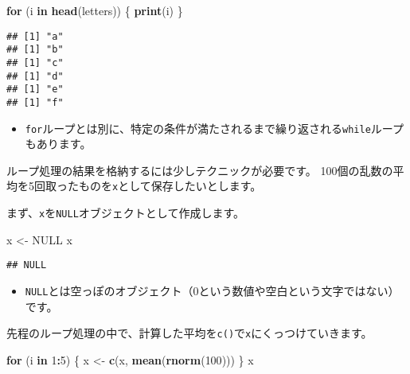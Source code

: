 \documentclass[]{bxjsarticle}
\newenvironment{Shaded}{\begin{snugshade}}{\end{snugshade}}
\newcommand{\ControlFlowTok}[1]{\textcolor[rgb]{0.13,0.29,0.53}{\textbf{#1}}}
\newcommand{\DecValTok}[1]{\textcolor[rgb]{0.00,0.00,0.81}{#1}}
\newcommand{\KeywordTok}[1]{\textcolor[rgb]{0.13,0.29,0.53}{\textbf{#1}}}
\newcommand{\NormalTok}[1]{#1}
\newcommand{\OperatorTok}[1]{\textcolor[rgb]{0.81,0.36,0.00}{\textbf{#1}}}
\newcommand{\OtherTok}[1]{\textcolor[rgb]{0.56,0.35,0.01}{#1}}
\newcommand{\StringTok}[1]{\textcolor[rgb]{0.31,0.60,0.02}{#1}}
\providecommand{\tightlist}{%
  \setlength{\itemsep}{0pt}\setlength{\parskip}{0pt}}
\begin{document}
\begin{Shaded}
\begin{Highlighting}[]
\ControlFlowTok{for}\NormalTok{ (i }\ControlFlowTok{in} \KeywordTok{head}\NormalTok{(letters)) \{}
  \KeywordTok{print}\NormalTok{(i)}
\NormalTok{\}}
\end{Highlighting}
\end{Shaded}

\begin{verbatim}
## [1] "a"
## [1] "b"
## [1] "c"
## [1] "d"
## [1] "e"
## [1] "f"
\end{verbatim}

\begin{itemize}
\tightlist
\item
  \texttt{for}ループとは別に、特定の条件が満たされるまで繰り返される\texttt{while}ループもあります。
\end{itemize}

ループ処理の結果を格納するには少しテクニックが必要です。
100個の乱数の平均を5回取ったものを\texttt{x}として保存したいとします。

まず、\texttt{x}を\texttt{NULL}オブジェクトとして作成します。

\begin{Shaded}
\begin{Highlighting}[]
\NormalTok{x <-}\StringTok{ }\OtherTok{NULL}
\NormalTok{x}
\end{Highlighting}
\end{Shaded}

\begin{verbatim}
## NULL
\end{verbatim}

\begin{itemize}
\tightlist
\item
  \texttt{NULL}とは空っぽのオブジェクト（0という数値や空白という文字ではない）です。
\end{itemize}

先程のループ処理の中で、計算した平均を\texttt{c()}で\texttt{x}にくっつけていきます。

\begin{Shaded}
\begin{Highlighting}[]
\ControlFlowTok{for}\NormalTok{ (i }\ControlFlowTok{in} \DecValTok{1}\OperatorTok{:}\DecValTok{5}\NormalTok{) \{}
\NormalTok{  x <-}\StringTok{ }\KeywordTok{c}\NormalTok{(x, }\KeywordTok{mean}\NormalTok{(}\KeywordTok{rnorm}\NormalTok{(}\DecValTok{100}\NormalTok{)))}
\NormalTok{\}}
\NormalTok{x}
\end{Highlighting}
\end{Shaded}
\end{document}
